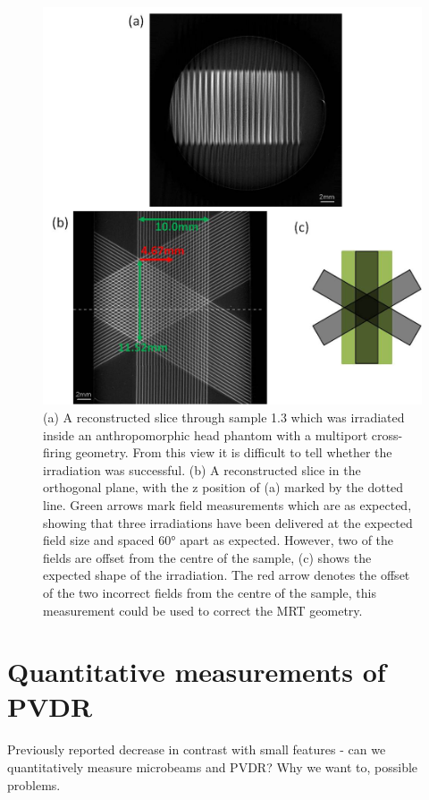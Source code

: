 	
	\begin{figure}
		\centering
		\includegraphics[width=0.9\linewidth]{mrt_img/mrt_Fig4}
		\caption{(a) A reconstructed slice through sample 1.3 which was irradiated inside an anthropomorphic head phantom with a multiport cross-firing geometry. From this view it is difficult to tell whether the irradiation was successful. (b) A reconstructed slice in the orthogonal plane, with the z position of (a) marked by the dotted line. Green arrows mark field measurements which are as expected, showing that three irradiations have been delivered at the expected field size and spaced \ang{60} apart as expected. However, two of the fields are offset from the centre of the sample, (c) shows the expected shape of the irradiation. The red arrow denotes the offset of the two incorrect fields from the centre of the sample, this measurement could be used to correct the MRT geometry.}
		\label{fig:Fig4L7}
	\end{figure}
	
	
	
	
	\section{Quantitative measurements of PVDR}
	\label{sec:quantPVDR}
	
	Previously reported decrease in contrast with small features - can we quantitatively measure microbeams and PVDR? Why we want to, possible problems.
	

